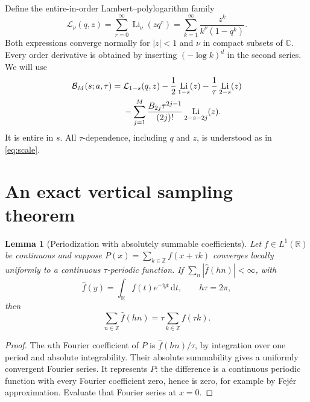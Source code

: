 \documentclass[11pt,a4paper]{article}
\numberwithin{equation}{section}
\newtheorem{lemma}[theorem]{Lemma}
\theoremstyle{definition}
\theoremstyle{remark}
\DeclareMathOperator{\Li}{Li}
\newcommand{\dd}{\,\mathrm d}
\newcommand{\ii}{\mathrm i}
\newcommand{\Z}{\mathbb Z}
\newcommand{\C}{\mathbb C}
\newcommand{\Bcal}{\mathcal B}
\newcommand{\Lcal}{\mathcal L}
\begin{document}
Define the entire-in-order Lambert--polylogarithm family
\begin{equation}\label{eq:Lambert}
 \Lcal_\nu(q,z)=\sum_{r=0}^{\infty}\Li_\nu(zq^r)
              =\sum_{k=1}^{\infty}\frac{z^k}{k^\nu(1-q^k)}.
\end{equation}
Both expressions converge normally for $|z|<1$ and $\nu$ in compact
subsets of $\C$. Every order derivative is obtained by inserting
$(-\log k)^d$ in the second series. We will use
\begin{align}
 \Bcal_M(s;a,\tau)={}&\Lcal_{1-s}(q,z)-\frac12\Li_{1-s}(z)
          -\frac1\tau\Li_{2-s}(z)\notag\\
 &-\sum_{j=1}^M\frac{B_{2j}\tau^{2j-1}}{(2j)!}\Li_{2-s-2j}(z).
 \label{eq:bracket}
\end{align}
It is entire in $s$. All $\tau$-dependence, including $q$ and $z$,
is understood as in \eqref{eq:scale}.

\section{An exact vertical sampling theorem}

\begin{lemma}[Periodization with absolutely summable coefficients]
\label{lem:periodization}
Let $f\in L^1(\mathbb R)$ be continuous and suppose
$P(x)=\sum_{k\in\Z}f(x+\tau k)$ converges locally uniformly to a
continuous $\tau$-periodic function. If
$\sum_n|\widehat f(hn)|<\infty$, with
\[
 \widehat f(y)=\int_{\mathbb R}f(t)e^{-\ii yt}\dd t,
 \qquad h\tau=2\pi,
\]
then
\begin{equation}\label{eq:periodization}
 \sum_{n\in\Z}\widehat f(hn)=\tau\sum_{k\in\Z}f(\tau k).
\end{equation}
\end{lemma}
\begin{proof}
The $n$th Fourier coefficient of $P$ is $\widehat f(hn)/\tau$,
by integration over one period and absolute integrability. Their
absolute summability gives a uniformly convergent Fourier series.
It represents $P$: the difference is a continuous periodic function
with every Fourier coefficient zero, hence is zero, for example by
Fej\'er approximation. Evaluate that Fourier series at $x=0$.
\end{proof}
\end{document}

